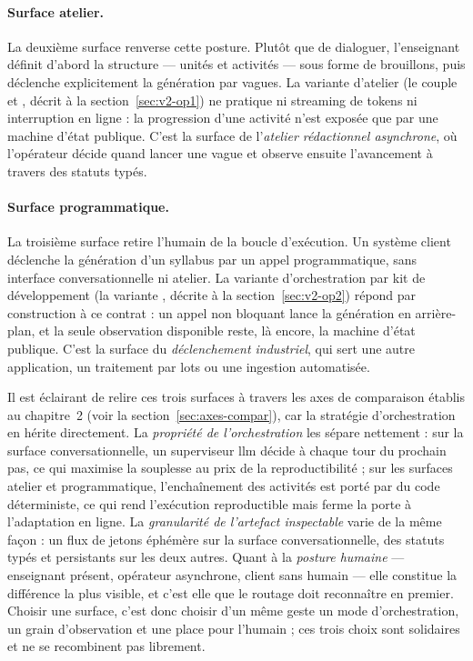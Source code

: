\paragraph{Surface atelier.}
La deuxième surface renverse cette posture. Plutôt que de dialoguer,
l'enseignant définit d'abord la structure — unités et activités — sous
forme de brouillons, puis déclenche explicitement la génération par
vagues. La variante d'atelier (le couple 
et , décrit à la
section~\ref{sec:v2-op1}) ne pratique ni streaming de tokens ni
interruption en ligne : la progression d'une activité n'est exposée
que par une machine d'état publique. C'est la surface de l'\emph{atelier
rédactionnel asynchrone}, où l'opérateur décide quand lancer une vague
et observe ensuite l'avancement à travers des statuts typés.

\paragraph{Surface programmatique.}
La troisième surface retire l'humain de la boucle d'exécution. Un
système client déclenche la génération d'un syllabus par un appel
programmatique, sans interface conversationnelle ni atelier. La
variante d'orchestration par kit de développement (la variante
, décrite à la section~\ref{sec:v2-op2})
répond par construction à ce contrat : un appel non bloquant lance la
génération en arrière-plan, et la seule observation disponible reste,
là encore, la machine d'état publique. C'est la surface du
\emph{déclenchement industriel}, qui sert une autre application, un
traitement par lots ou une ingestion automatisée.

Il est éclairant de relire ces trois surfaces à travers les axes de
comparaison établis au chapitre~2 (voir la
section~\ref{sec:axes-compar}), car la stratégie d'orchestration en
hérite directement. La \emph{propriété de l'orchestration} les sépare
nettement : sur la surface conversationnelle, un superviseur \gls{llm}
décide à chaque tour du prochain pas, ce qui maximise la souplesse au
prix de la reproductibilité ; sur les surfaces atelier et
programmatique, l'enchaînement des activités est porté par du code
déterministe, ce qui rend l'exécution reproductible mais ferme la porte
à l'adaptation en ligne. La \emph{granularité de l'artefact
inspectable} varie de la même façon : un flux de jetons éphémère sur la
surface conversationnelle, des statuts typés et persistants sur les
deux autres. Quant à la \emph{posture humaine} — enseignant présent,
opérateur asynchrone, client sans humain — elle constitue la différence
la plus visible, et c'est elle que le routage doit reconnaître en
premier. Choisir une surface, c'est donc choisir d'un même geste un
mode d'orchestration, un grain d'observation et une place pour
l'humain ; ces trois choix sont solidaires et ne se recombinent pas
librement.

